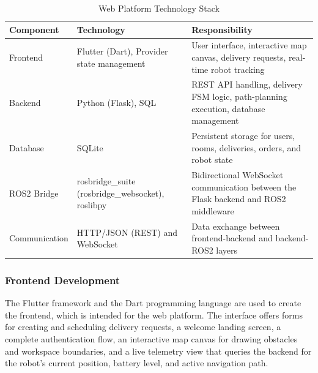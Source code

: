 \begin{table}[H]
	\centering
	\caption{Web Platform Technology Stack}
	\label{tab:web_stack}
	\begin{tabular}{|p{3cm}|p{4.5cm}|p{6.5cm}|}
		\hline
		\textbf{Component} & \textbf{Technology} & \textbf{Responsibility} \\
		\hline
		Frontend & Flutter (Dart), Provider state management & User interface, interactive map canvas, delivery requests, real-time robot tracking \\
		\hline
		Backend & Python (Flask), SQL & REST API handling, delivery FSM logic, path-planning execution, database management \\
		\hline
		Database & SQLite & Persistent storage for users, rooms, deliveries, orders, and robot state \\
		\hline
		ROS2 Bridge & rosbridge\_suite (rosbridge\_websocket), roslibpy & Bidirectional WebSocket communication between the Flask backend and ROS2 middleware \\
		\hline
		Communication & HTTP/JSON (REST) and WebSocket & Data exchange between frontend-backend and backend-ROS2 layers \\
		\hline
	\end{tabular}
\end{table}

\subsubsection{Frontend Development}

The Flutter framework and the Dart programming language are used to create the frontend, which is intended for the web platform. The interface offers forms for creating and scheduling delivery requests, a welcome landing screen, a complete authentication flow, an interactive map canvas for drawing obstacles and workspace boundaries, and a live telemetry view that queries the backend for the robot's current position, battery level, and active navigation path.


